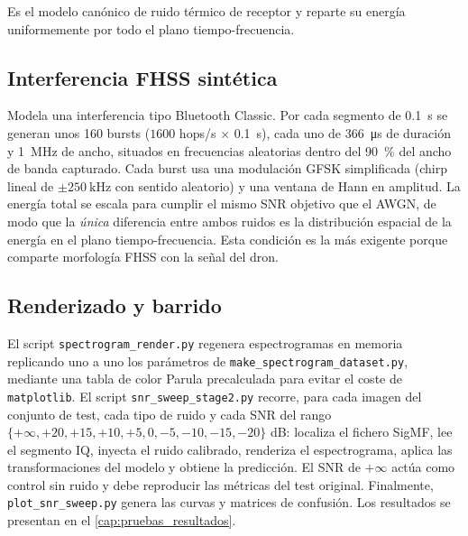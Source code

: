 Es el modelo canónico de ruido térmico de receptor y reparte su energía uniformemente por todo el plano tiempo-frecuencia.

\subsection{Interferencia FHSS sintética}

Modela una interferencia tipo Bluetooth Classic. Por cada segmento de \SI{0.1}{\second} se generan unos \num{160} bursts ($\num{1600}$ hops/s $\times$ \SI{0.1}{\second}), cada uno de \SI{366}{\micro\second} de duración y \SI{1}{\mega\hertz} de ancho, situados en frecuencias aleatorias dentro del \SI{90}{\percent} del ancho de banda capturado. Cada burst usa una modulación GFSK simplificada (chirp lineal de $\pm\SI{250}{\kilo\hertz}$ con sentido aleatorio) y una ventana de Hann en amplitud. La energía total se escala para cumplir el mismo SNR objetivo que el AWGN, de modo que la \emph{única} diferencia entre ambos ruidos es la distribución espacial de la energía en el plano tiempo-frecuencia. Esta condición es la más exigente porque comparte morfología FHSS con la señal del dron.

\subsection{Renderizado y barrido}

El script \texttt{spectrogram\_render.py} regenera espectrogramas en memoria replicando uno a uno los parámetros de \texttt{make\_spectrogram\_dataset.py}, mediante una tabla de color Parula precalculada para evitar el coste de \texttt{matplotlib}. El script \texttt{snr\_sweep\_stage2.py} recorre, para cada imagen del conjunto de test, cada tipo de ruido y cada SNR del rango $\{+\infty, +20, +15, +10, +5, 0, -5, -10, -15, -20\}$ dB: localiza el fichero SigMF, lee el segmento IQ, inyecta el ruido calibrado, renderiza el espectrograma, aplica las transformaciones del modelo y obtiene la predicción. El SNR de $+\infty$ actúa como control sin ruido y debe reproducir las métricas del test original. Finalmente, \texttt{plot\_snr\_sweep.py} genera las curvas y matrices de confusión. Los resultados se presentan en el \cref{cap:pruebas_resultados}.